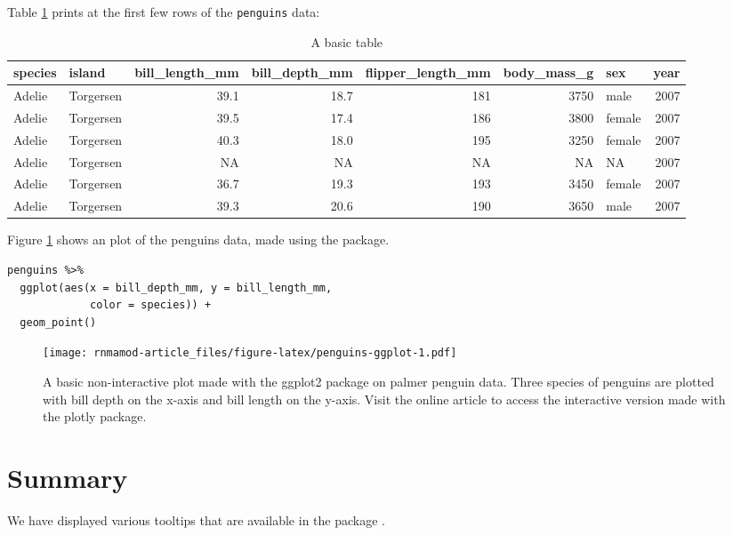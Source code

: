 Table \ref{tab:penguins-tab-static} prints at the first few rows of the \texttt{penguins} data:

\begin{table}

\caption{\label{tab:penguins-tab-static}A basic table}
\centering
\fontsize{7}{9}\selectfont
\begin{tabular}[t]{l|l|r|r|r|r|l|r}
\hline
species & island & bill\_length\_mm & bill\_depth\_mm & flipper\_length\_mm & body\_mass\_g & sex & year\\
\hline
Adelie & Torgersen & 39.1 & 18.7 & 181 & 3750 & male & 2007\\
\hline
Adelie & Torgersen & 39.5 & 17.4 & 186 & 3800 & female & 2007\\
\hline
Adelie & Torgersen & 40.3 & 18.0 & 195 & 3250 & female & 2007\\
\hline
Adelie & Torgersen & NA & NA & NA & NA & NA & 2007\\
\hline
Adelie & Torgersen & 36.7 & 19.3 & 193 & 3450 & female & 2007\\
\hline
Adelie & Torgersen & 39.3 & 20.6 & 190 & 3650 & male & 2007\\
\hline
\end{tabular}
\end{table}

Figure \ref{fig:penguins-ggplot} shows an plot of the penguins data, made using the  package.

\begin{verbatim}
penguins %>% 
  ggplot(aes(x = bill_depth_mm, y = bill_length_mm, 
             color = species)) + 
  geom_point()
\end{verbatim}

\begin{figure}
\centering
\texttt{[image: rnmamod-article\_files/figure-latex/penguins-ggplot-1.pdf]}
\caption{\label{fig:penguins-ggplot}A basic non-interactive plot made with the ggplot2 package on palmer penguin data. Three species of penguins are plotted with bill depth on the x-axis and bill length on the y-axis. Visit the online article to access the interactive version made with the plotly package.}
\end{figure}

\hypertarget{summary}{%
\section{Summary}\label{summary}}

We have displayed various tooltips that are available in the package .

